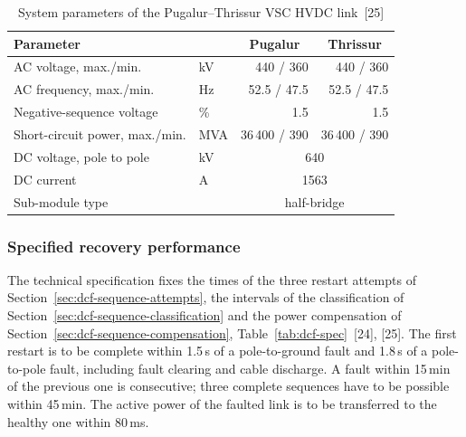 \begin{table}[!ht]
  \centering
  \begin{tabular}{@{}l l r r@{}}
    \toprule
    \textbf{Parameter} & & \multicolumn{1}{c}{\textbf{Pugalur}}
      & \multicolumn{1}{c}{\textbf{Thrissur}} \\
    \midrule
    AC voltage, max./min.          & kV   & 440 / 360 & 440 / 360 \\
    AC frequency, max./min.        & Hz   & 52.5 / 47.5 & 52.5 / 47.5 \\
    Negative-sequence voltage      & \%   & 1.5 & 1.5 \\
    Short-circuit power, max./min. & MVA  & 36\,400 / 390 & 36\,400 / 390 \\
    DC voltage, pole to pole       & kV   & \multicolumn{2}{c}{640} \\
    DC current                     & A    & \multicolumn{2}{c}{1563} \\
    Sub-module type                &      & \multicolumn{2}{c}{half-bridge} \\
    \bottomrule
  \end{tabular}
  \caption{System parameters of the Pugalur--Thrissur VSC HVDC link~[25]}
  \label{tab:dcf-system}
\end{table}

\subsubsection{Specified recovery performance}
\label{sec:dcf-pugalur-spec}

The technical specification fixes the times of the three restart attempts
of Section~\ref{sec:dcf-sequence-attempts}, the intervals of the
classification of Section~\ref{sec:dcf-sequence-classification} and the
power compensation of Section~\ref{sec:dcf-sequence-compensation},
Table~\ref{tab:dcf-spec}~[24], [25]. The first restart is to be complete
within 1.5\,s of a pole-to-ground fault and 1.8\,s of a pole-to-pole fault,
including fault clearing and cable discharge. A fault within 15\,min of the
previous one is consecutive; three complete sequences have to be possible
within 45\,min. The active power of the faulted link is to be transferred to
the healthy one within 80\,ms.

